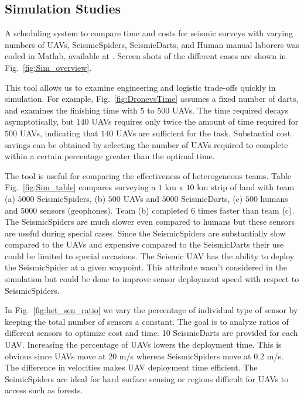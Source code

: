 \subsection{Simulation Studies}

A scheduling system to compare  time and costs for seismic surveys with varying numbers of UAVs, SeismicSpiders, SeismicDarts, and Human manual laborers was coded in  {\sc Matlab}, available at \cite{Srikanth2016seismicScheduler}. Screen shots of the different cases are shown in Fig.~\ref{fig:Sim_overview}.

This tool allows us to examine engineering and logistic trade-offs quickly in simulation.  For example, Fig.~\ref{fig:DronevsTime} assumes a fixed number of darts, and examines the finishing time with $5$ to $500$ UAVs.  The time required decays asymptotically, but $140$ UAVs requires only twice the amount of time required for $500$ UAVs, indicating that $140$ UAVs are sufficient for the task.%
Substantial cost savings can be obtained by selecting the number of UAVs required to complete within a certain percentage greater than the optimal time.

The tool is useful for comparing the effectiveness of heterogeneous teams.  Table Fig.~\ref{fig:Sim_table} compares surveying a $1$ km x $10$ km strip of land with team (a) $5000$ SeismicSpiders, (b) $500$ UAVs and $5000$ SeismicDarts, (c) $500$ humans and $5000$ sensors (geophones).  Team (b) completed $6$ times faster than team (c). The SeismicSpiders are much slower even compared to humans but these sensors are useful during special cases. Since the SeismicSpiders are substantially slow compared to the UAVs and expensive compared to the SeismicDarts their use could be limited to special occasions. The Seismic UAV has the ability to deploy the SeismicSpider at a given waypoint. This attribute wasn't considered in the simulation but could be done to improve sensor deployment speed with respect to SeismicSpiders.
   
In Fig.~\ref{fig:het_sen_ratio} we vary the percentage of individual type of sensor by keeping the total number of sensors a constant. The goal is to analyze ratios of different sensors to optimize cost and time.  10 SeismicDarts are provided for each UAV. Increasing the percentage of UAVs lowers the deployment time. This is obvious since UAVs move at 20 m/s whereas SeismicSpiders move at 0.2 m/s. The difference in velocities makes UAV deployment time efficient. The SeimicSpiders are ideal for hard surface sensing or regions difficult for UAVs to access such as forests.


